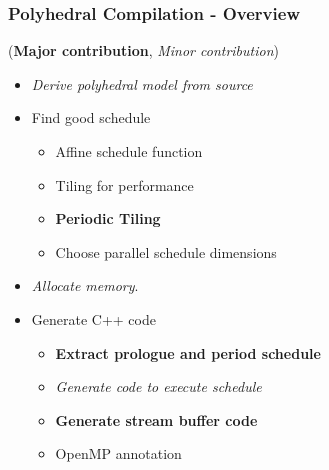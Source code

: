 \documentclass{beamer}
\begin{document}
\begin{frame}
\frametitle{Polyhedral Compilation - Overview}

(\textbf{Major contribution}, \textit{Minor contribution})

\begin{itemize}
\item \textit{Derive polyhedral model from source}
\item Find good schedule
    \begin{itemize}
    \item Affine schedule function
    \item Tiling for performance
    \item \textbf{Periodic Tiling}
    \item Choose parallel schedule dimensions
    \end{itemize}
\item \textit{Allocate memory}.
\item Generate C++ code
    \begin{itemize}
    \item \textbf{Extract prologue and period schedule}
    \item \textit{Generate code to execute schedule}
    \item \textbf{Generate stream buffer code}
    \item OpenMP annotation
    \end{itemize}
\end{itemize}


\end{frame}
\end{document}
